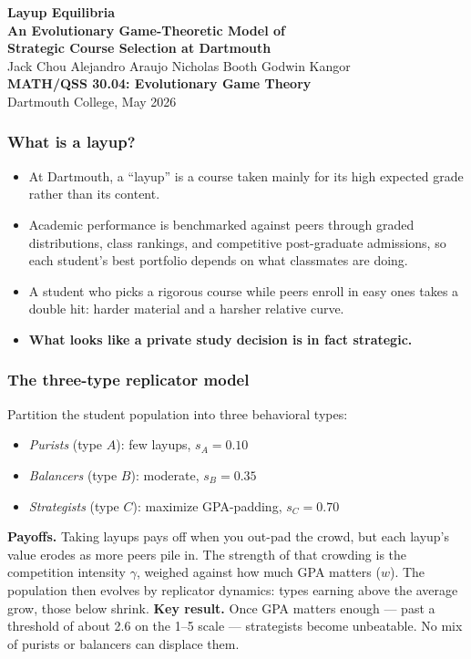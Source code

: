 \documentclass[xcolor=dvipsnames,11pt,table,aspectratio=169]{beamer}
\begin{document}
\begin{frame}
\begin{center}
\vspace{0.2cm}
{\Large \textbf{Layup Equilibria}}\\[4pt]
{\large \textbf{An Evolutionary Game-Theoretic Model of\\
Strategic Course Selection at Dartmouth}}\\[14pt]
\small Jack Chou \quad Alejandro Araujo \quad Nicholas Booth \quad Godwin Kangor\\[10pt]
\footnotesize\textcolor{DartmouthGreen}{\textbf{MATH/QSS 30.04: Evolutionary Game Theory}}\\[1pt]
\footnotesize Dartmouth College, May 2026
\end{center}
\end{frame}

\begin{frame}
\frametitle{What is a layup?}
\small
\begin{itemize}
\item At Dartmouth, a ``layup'' is a course taken mainly for its
      high expected grade rather than its content.
\item Academic performance is benchmarked against peers through graded
      distributions, class rankings, and competitive post-graduate
      admissions, so each student's best portfolio depends on what
      classmates are doing.
\item A student who picks a rigorous course while peers enroll in easy
      ones takes a double hit: harder material and a harsher relative
      curve.
\item \textbf{What looks like a private study decision is in fact
      strategic.}
\end{itemize}
\end{frame}

\begin{frame}
\frametitle{The three-type replicator model}
\small
Partition the student population into three behavioral types:
\begin{itemize}
\itemsep1pt
\item \emph{Purists} (type $A$): few layups, $s_A = 0.10$
\item \emph{Balancers} (type $B$): moderate, $s_B = 0.35$
\item \emph{Strategists} (type $C$): maximize GPA-padding, $s_C = 0.70$
\end{itemize}
\vskip 4pt
\textbf{Payoffs.} Taking layups pays off when you out-pad the crowd, but
each layup's value erodes as more peers pile in. The strength of that
crowding is the competition intensity $\gamma$, weighed against how much
GPA matters ($w$). The population then evolves by replicator dynamics:
types earning above the average grow, those below shrink.
\vskip 6pt
\textbf{Key result.} Once GPA matters enough --- past a threshold of
about 2.6 on the 1--5 scale --- strategists become unbeatable. No mix of
purists or balancers can displace them.
\end{frame}
\end{document}
